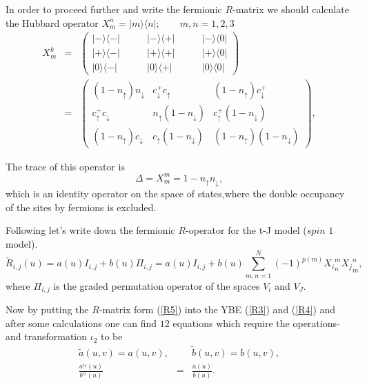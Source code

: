 \documentclass[a4paper,12pt]{article}
\begin{document}
In order to proceed further and write the fermionic $R$-matrix we should 
calculate the Hubbard operator
${X}_m^n=\mid m\rangle\langle n\mid ; \qquad m,n=1,2,3$ 
\begin{eqnarray}
\label{X1}
X_{ m}^k &=&\left( 
\begin{array}{lll}
|-\rangle \langle -|&\qquad |- \rangle \langle +| 
&\qquad |-\rangle \langle 0| \\
|+\rangle \langle -|&\qquad |+\rangle \langle +| 
&\qquad |+\rangle \langle 0|\\ 
|0\rangle \langle -|&\qquad |0\rangle \langle +| 
&\qquad |0\rangle \langle 0|  
\end{array}
\right) \nonumber\\
&=&\left( 
\begin{array}{lll}
(1-n_{\uparrow}) n_{\downarrow}&c^{+}_{\downarrow} c_{\uparrow}
 &(1-n_{\uparrow})c^{+}_{\downarrow} \\
c^{+}_{\uparrow} c_{\downarrow}& n_{\uparrow}(1- n_{\downarrow})
& c^{+}_{\uparrow}(1-n_{\downarrow}) \\ 
(1-n_{\uparrow})c_{\downarrow} & c_{\uparrow}(1-n_{\downarrow})
&(1-n_{\uparrow})(1- n_{\downarrow}) 
\end{array}
\right),
\end{eqnarray}

The trace of this operator is
\begin{equation}
\label{D}
\Delta=X_m^m=1-n_{\uparrow}n_{\downarrow},
\end{equation}
which is an identity operator on the space of states,where the
double occupancy of the sites by fermions is excluded.

Following \cite{AK} let's write down the fermionic $R$-operator
for the t-J model ($spin$ $1$ \cite{U,L,S} model).
\begin{equation}
\label{R5}
\check{R}_{i,j}(u)=a(u)I_{i,j}+b(u)\Pi_{i,j}=a(u)I_{i,j}+b(u)\sum_{m,n=1}^N
(-1)^{p(m)}{X_i}_{n}^m{X_j}_m^n,
\end{equation}
where ${\Pi}_{i,j}$ is the graded permutation operator of the spaces $V_i$ and
$V_J$.

Now by putting the $R$-matrix form (\ref{R5}) into the YBE (\ref{R3})
and (\ref{R4}) and after some calculations one can find $12$ equations
which require the operations $\tilde{}$ and transformation $\iota_2$ to be
\begin{eqnarray}
\label{AB1}
\tilde{a}(u,v)=a(u,v),& &  \tilde{b}(u,v)=b(u,v), \nonumber\\
\frac{a^{\iota_2}(u)}{b^{\iota_2}(u)}&=&\frac{a(u)}{b(u)}.
\end{eqnarray}
\end{document}
